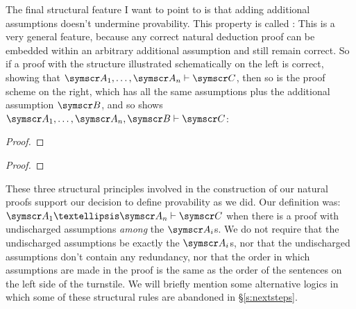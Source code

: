 The final structural feature I want to point to is that adding additional assumptions doesn't undermine provability. This property is called :  This is a very general feature, because any correct natural deduction proof can be embedded within an arbitrary additional assumption and still remain correct. So if a proof with the structure illustrated schematically on the left is correct, showing that $\meta{A}_{1},\ldots,\meta{A}_{n} \proves \meta{C}$, then so is the proof scheme on the right, which has all the same assumptions plus the additional assumption $\meta{B}$, and so shows $\meta{A}_{1},\ldots,\meta{A}_{n},\meta{B} \proves \meta{C}$: \begin{multicols}{2}\noindent\begin{proof}
	\have[\ ]{}{\vdots}
	\open
	\have[\ ]{}{\vdots}
\end{proof}\qquad\begin{proof}
	\open
	\have[\ ]{}{\vdots}
	\open
	\have[\ ]{}{\vdots}
\end{proof}\end{multicols}

These three structural principles involved in the construction of our natural proofs support our decision to define provability as we did. Our definition was:  $\meta{A}_{1}…\meta{A}_{n}\proves \meta{C}$ when there is a proof with undischarged assumptions \emph{among} the $\meta{A}_{i}$s. We do not require that the undischarged assumptions be exactly the $\meta{A}_{i}$s, nor that the undischarged assumptions don't contain any redundancy, nor that the order in which assumptions are made in the proof is the same as the order of the sentences on the left side of the turnstile. We will briefly mention some alternative logics in which some of these structural rules are abandoned in §\ref{s:nextsteps}.



